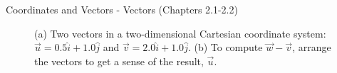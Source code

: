 \documentclass{beamer}
\begin{document}
\begin{frame}{Coordinates and Vectors - Vectors (Chapters 2.1-2.2)}
\begin{figure}
\centering
{}
\caption{\label{fig:twovectors3} (a) Two vectors in a two-dimensional Cartesian coordinate system: $\vec{u} = 0.5\hat{i}+1.0\hat{j}$ and $\vec{v} = 2.0\hat{i}+1.0\hat{j}$.  (b) To compute $\vec{w}-\vec{v}$, arrange the vectors to get a sense of the result, $\vec{u}$.}
\end{figure}
\end{frame}
\end{document}
